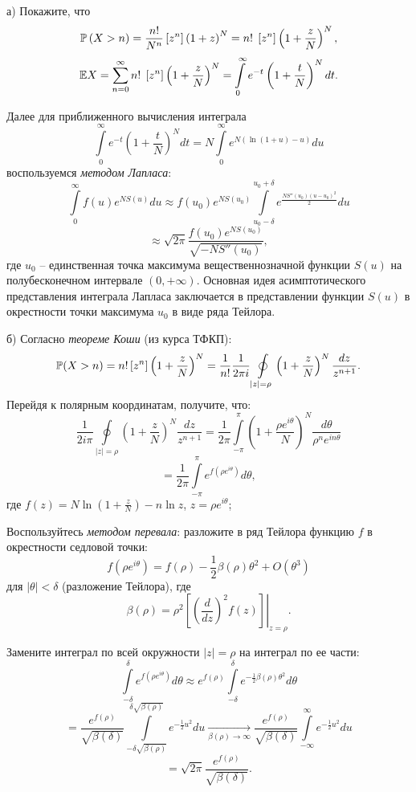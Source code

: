 \begin{ordre}

а) Покажите, что  
$$\mathrm{{\mathbb P}} \left ( X>n \right ) =\frac{n!}{N^n} \left[ {z^n} \right]\left( {1+z} 
\right)^N=n! \; \left[ {z^n} \right] \left( {1+\frac{z}{N}} \right)^N,$$
$$\mathrm{{\mathbb E}} X
=
\sum\limits_{n=0}^{\infty} 
n! \; \left[ z^n \right] \left( 1+\frac{z}{N} \right)^N
=
\int\limits_0^{\infty} e^{-t} \left( 1+\frac{t}{N} \right)^N dt. $$

Далее для приближенного вычисления интеграла  
$$\int\limits_0^\infty 
{e^{-t}\left( {1+\frac{t}{N}} \right)^Ndt} =N\int\limits_0^\infty 
{e^{N\left( {\ln (1+u)-u} \right)}du} $$
 воспользуемся \textit{методом Лапласа}:
$$
 \int\limits_0^\infty {f(u)e^{NS(u)}du} \approx f(u_0 ) e^{NS(u_0 
)}\int\limits_{u_0 -\delta }^{u_0 +\delta } {e^{\frac{NS''(u_0 )(u-u_0 
)^2}{2}}} du $$
$$\approx \sqrt {2\pi } \frac{f(u_0 )e^{NS(u_0 )}}{\sqrt {-NS''(u_0 )} }, $$
где $u_0 $ -- единственная точка максимума вещественнозначной функции 
$S(u)$ на полубесконечном интервале $(0, +\infty )$. Основная идея 
асимптотического представления интеграла Лапласа заключается в представлении 
функции $S(u)$ в окрестности точки максимума $u_0 $ в виде ряда Тейлора.

б) Согласно \textit{теореме Коши} (из курса ТФКП): 
$$ \mathrm{{\mathbb P}}(X>n)=n!\left[ {z^n} \right]\left( {1+\frac{z}{N}} 
\right)^N=\frac{1}{n!}\frac{1}{2\pi i }\oint\limits_{\vert z\vert =\rho } 
{\left( {1+\frac{z}{N}} \right)^N\frac{dz}{z^{n+1}}}. $$
Перейдя к полярным координатам, получите, что:
$$
\frac{1}{2i\pi }\oint\limits_{\vert z\vert =\rho } {\left( {1+\frac{z}{N}} 
\right)^N \frac{dz}{z^{n+1}}}  =\frac{1}{2\pi }\int\limits_{-\pi }^\pi {\left( 
{1+\frac{\rho e^{i\theta }}{N}} \right)^N\frac{d\theta }{\rho ^ne^{in\theta 
}}} $$
$$=\frac{1}{2\pi }\int\limits_{-\pi }^\pi {e^{f(\rho e^{i\theta })}d\theta 
} ,
$$
где $f(z)=N\ln \left( {1+\frac{z}{N}} \right)-n\ln z$, $z=\rho 
e^{i\theta }$;

Воспользуйтесь \textit{методом перевала}: разложите в ряд Тейлора функцию $f$ в окрестности седловой 
точки: $$f(\rho e^{i\theta })=f(\rho )-\frac{1}{2}\beta (\rho )\theta 
^2+O(\theta ^3)$$ для $\left| \theta \right|<\delta $ (разложение Тейлора), 
где $$\beta (\rho )=\rho ^2\left. {\left[ {\left( {\frac{d}{dz}} 
\right)^2f(z)} \right]} \right|_{z=\rho }. $$

Замените интеграл по всей окружности $\vert z\vert =\rho $ на интеграл по ее 
части: 
$$
\int\limits_{-\delta }^\delta {e^{f(\rho e^{i\theta })}d\theta } 
\approx e^{f(\rho )}\int\limits_{-\delta }^\delta {e^{-\frac{1}{2}\beta 
(\rho )\theta ^2}d\theta } $$
$$=\frac{e^{f(\rho )}}{\sqrt {\beta (\delta )} 
}\int\limits_{-\delta \sqrt {\beta (\rho )} }^{\delta \sqrt {\beta (\rho )} 
} {e^{-\frac{1}{2}u^2} du}\mathop \to \limits_{\beta (\rho )\to \infty } 
\frac{e^{f(\rho )}}{\sqrt {\beta (\delta )} }\int\limits_{-\infty }^\infty 
{e^{-\frac{1}{2}u^2}du}  $$
$$=\sqrt {2\pi }\frac{e^{f(\rho )}}{\sqrt {\beta 
(\delta )} }.
$$


\end{ordre}
